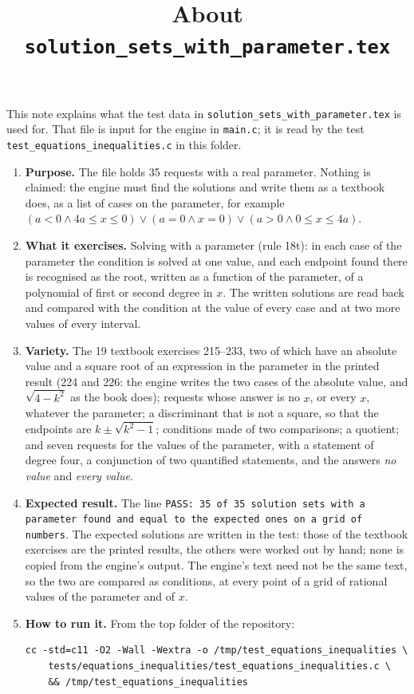 \documentclass[11pt,a4paper]{article}
\title{About \texttt{solution\_sets\_with\_parameter.tex}}
\author{}
\date{}
\begin{document}
\maketitle
This note explains what the test data in \texttt{solution\_sets\_with\_parameter.tex} is used for. That file is input for the engine in \texttt{main.c}; it is read by the test \texttt{test\_equations\_inequalities.c} in this folder.

\begin{enumerate}
\item \textbf{Purpose.} The file holds 35 requests with a real parameter. Nothing is claimed: the engine must find the solutions and write them as a textbook does, as a list of cases on the parameter, for example $(a < 0 \land 4a \le x \le 0) \lor (a = 0 \land x = 0) \lor (a > 0 \land 0 \le x \le 4a)$.

\item \textbf{What it exercises.} Solving with a parameter (rule 18t): in each case of the parameter the condition is solved at one value, and each endpoint found there is recognised as the root, written as a function of the parameter, of a polynomial of first or second degree in $x$. The written solutions are read back and compared with the condition at the value of every case and at two more values of every interval.

\item \textbf{Variety.} The 19 textbook exercises 215--233, two of which have an absolute value and a square root of an expression in the parameter in the printed result (224 and 226: the engine writes the two cases of the absolute value, and $\sqrt{4 - k^{2}}$ as the book does); requests whose answer is no $x$, or every $x$, whatever the parameter; a discriminant that is not a square, so that the endpoints are $k \pm \sqrt{k^{2} - 1}$; conditions made of two comparisons; a quotient; and seven requests for the values of the parameter, with a statement of degree four, a conjunction of two quantified statements, and the answers \emph{no value} and \emph{every value}.

\item \textbf{Expected result.} The line \texttt{PASS: 35 of 35 solution sets with a parameter found and equal to the expected ones on a grid of numbers}. The expected solutions are written in the test: those of the textbook exercises are the printed results, the others were worked out by hand; none is copied from the engine's output. The engine's text need not be the same text, so the two are compared as conditions, at every point of a grid of rational values of the parameter and of $x$.

\item \textbf{How to run it.} From the top folder of the repository:
\begin{verbatim}
cc -std=c11 -O2 -Wall -Wextra -o /tmp/test_equations_inequalities \
    tests/equations_inequalities/test_equations_inequalities.c \
    && /tmp/test_equations_inequalities
\end{verbatim}
\end{enumerate}
\end{document}
